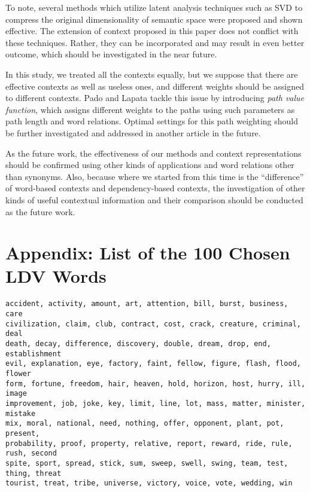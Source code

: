 \documentclass[english]{jnlp_1.4}
\begin{document}
To note, several methods which utilize latent analysis techniques such
as SVD \cite{Deerwester:90} to compress the original dimensionality of
semantic space were proposed and shown effective. The extension of
context proposed in this paper does not conflict with these
techniques. Rather, they can be incorporated and may result in even
better outcome, which should be investigated in the near future.

In this study, we treated all the contexts equally, but we suppose
that there are effective contexts as well as useless ones, and
different weights should be assigned to different contexts. Pado and
Lapata \cite{Pado:07} tackle this issue by introducing {\em path value
  function}, which assigns different weights to the paths using such
parameters as path length and word relations. Optimal settings for
this path weighting should be further investigated and addressed in
another article in the future.

As the future work, the effectiveness of our methods and context
representations should be confirmed using other kinds of applications
and word relations other than synonyms. Also, because where we started
from this time is the ``difference'' of word-based contexts and
dependency-based contexts, the investigation of other kinds of useful
contextual information and their comparison should be conducted as the
future work.

\section*{Appendix: List of the 100 Chosen LDV Words}

\begin{verbatim}
accident, activity, amount, art, attention, bill, burst, business, care
civilization, claim, club, contract, cost, crack, creature, criminal, deal
death, decay, difference, discovery, double, dream, drop, end, establishment
evil, explanation, eye, factory, faint, fellow, figure, flash, flood, flower
form, fortune, freedom, hair, heaven, hold, horizon, host, hurry, ill, image
improvement, job, joke, key, limit, line, lot, mass, matter, minister, mistake
mix, moral, national, need, nothing, offer, opponent, plant, pot, present,
probability, proof, property, relative, report, reward, ride, rule, rush, second
spite, sport, spread, stick, sum, sweep, swell, swing, team, test, thing, threat
tourist, treat, tribe, universe, victory, voice, vote, wedding, win
\end{verbatim}
\end{document}
